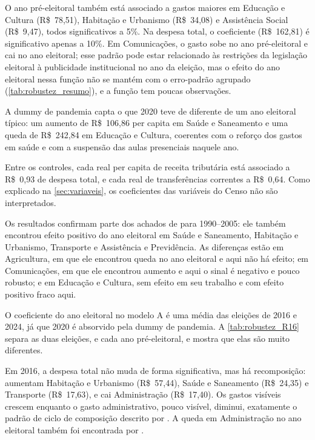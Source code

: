 O ano pré-eleitoral também está associado a gastos maiores em Educação e Cultura (R\$~78,51), Habitação e Urbanismo (R\$~34,08) e Assistência Social (R\$~9,47), todos significativos a 5\%. Na despesa total, o coeficiente (R\$~162,81) é significativo apenas a 10\%. Em Comunicações, o gasto sobe no ano pré-eleitoral e cai no ano eleitoral; esse padrão pode estar relacionado às restrições da legislação eleitoral à publicidade institucional no ano da eleição, mas o efeito do ano eleitoral nessa função não se mantém com o erro-padrão agrupado (\autoref{tab:robustez_resumo}), e a função tem poucas observações.

A dummy de pandemia capta o que 2020 teve de diferente de um ano eleitoral típico: um aumento de R\$~106,86 per capita em Saúde e Saneamento e uma queda de R\$~242,84 em Educação e Cultura, coerentes com o reforço dos gastos em saúde e com a suspensão das aulas presenciais naquele ano.

Entre os controles, cada real per capita de receita tributária está associado a R\$~0,93 de despesa total, e cada real de transferências correntes a R\$~0,64. Como explicado na \autoref{sec:variaveis}, os coeficientes das variáveis do Censo não são interpretados.

Os resultados confirmam parte dos achados de \textcite{sakurai2009} para 1990--2005: ele também encontrou efeito positivo do ano eleitoral em Saúde e Saneamento, Habitação e Urbanismo, Transporte e Assistência e Previdência. As diferenças estão em Agricultura, em que ele encontrou queda no ano eleitoral e aqui não há efeito; em Comunicações, em que ele encontrou aumento e aqui o sinal é negativo e pouco robusto; e em Educação e Cultura, sem efeito em seu trabalho e com efeito positivo fraco aqui.

O coeficiente do ano eleitoral no modelo A é uma média das eleições de 2016 e 2024, já que 2020 é absorvido pela dummy de pandemia. A \autoref{tab:robustez_R16} separa as duas eleições, e cada ano pré-eleitoral, e mostra que elas são muito diferentes.

Em 2016, a despesa total não muda de forma significativa, mas há recomposição: aumentam Habitação e Urbanismo (R\$~57,44), Saúde e Saneamento (R\$~24,35) e Transporte (R\$~17,63), e cai Administração (R\$~17,40). Os gastos visíveis crescem enquanto o gasto administrativo, pouco visível, diminui, exatamente o padrão de ciclo de composição descrito por \textcite{drazen2010}. A queda em Administração no ano eleitoral também foi encontrada por \textcite{teixeira2021}.

